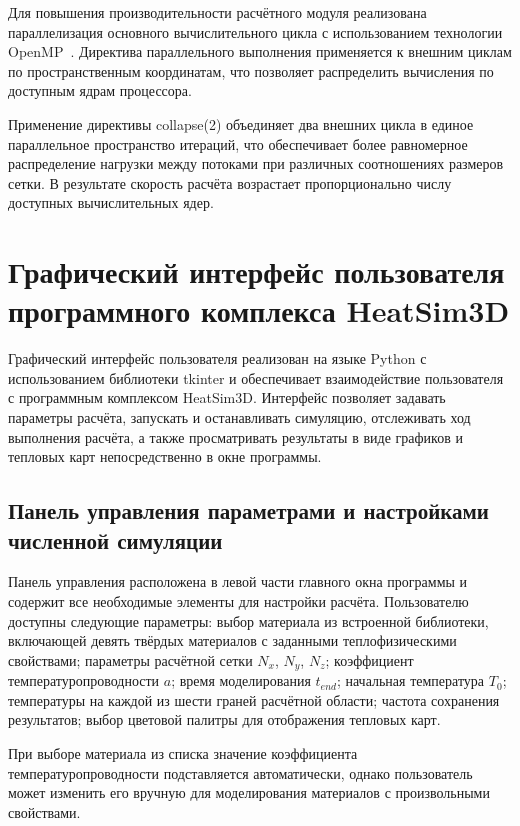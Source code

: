 Для повышения производительности расчётного модуля реализована 
параллелизация основного вычислительного цикла с использованием 
технологии OpenMP~\cite{chandra2001parallel}. Директива параллельного выполнения применяется 
к внешним циклам по пространственным координатам, что позволяет 
распределить вычисления по доступным ядрам процессора.

Применение директивы collapse(2) объединяет два внешних 
цикла в единое параллельное пространство итераций, что обеспечивает 
более равномерное распределение нагрузки между потоками при различных 
соотношениях размеров сетки. В результате скорость расчёта возрастает 
пропорционально числу доступных вычислительных ядер.

\section{Графический интерфейс пользователя программного комплекса HeatSim3D}

Графический интерфейс пользователя реализован на языке Python с 
использованием библиотеки tkinter и обеспечивает взаимодействие 
пользователя с программным комплексом HeatSim3D. Интерфейс позволяет 
задавать параметры расчёта, запускать и останавливать симуляцию, 
отслеживать ход выполнения расчёта, а также просматривать результаты 
в виде графиков и тепловых карт непосредственно в окне программы.

\subsection{Панель управления параметрами и настройками численной симуляции}

Панель управления расположена в левой части главного окна программы 
и содержит все необходимые элементы для настройки расчёта. 
Пользователю доступны следующие параметры: выбор материала из 
встроенной библиотеки, включающей девять твёрдых материалов с 
заданными теплофизическими свойствами; параметры расчётной сетки 
$N_x$, $N_y$, $N_z$; коэффициент температуропроводности $a$; 
время моделирования $t_{end}$; начальная температура $T_0$; 
температуры на каждой из шести граней расчётной области; 
частота сохранения результатов; выбор цветовой палитры для 
отображения тепловых карт.

При выборе материала из списка значение коэффициента 
температуропроводности подставляется автоматически, однако 
пользователь может изменить его вручную для моделирования 
материалов с произвольными свойствами.


